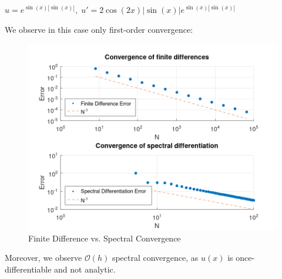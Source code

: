 $u = e^{\sin{(x)}|\sin{(x)}|},\; u' = 2 \cos{(2x)} \lvert \sin{(x)} \rvert e^{\sin{(x)}|\sin{(x)}|}$

\begin{solution}
  We observe in this case only first-order convergence:
  
  \begin{figure}[h]
    \centering
    \includegraphics[width=\textwidth]{problem_2b.png}
    \caption{Finite Difference vs. Spectral Convergence}
  \end{figure}
  
  Moreover, we observe $\mathcal{O}(h)$ spectral convergence, as $u(x)$ is once-differentiable and not analytic.
  \ \\
\end{solution}